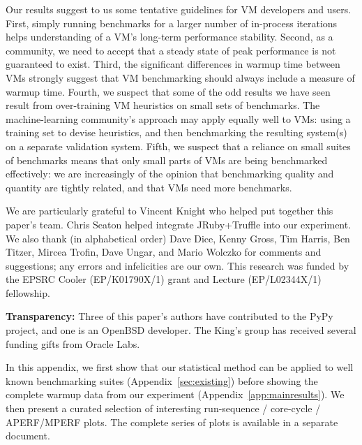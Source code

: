 \documentclass[acmlarge]{acmart}\settopmatter{printfolios=true}
\begin{document}
Our results suggest to us some tentative guidelines for VM
developers and users. First, simply running benchmarks for a larger number of
in-process iterations helps understanding of a VM's long-term
performance stability. Second, as a community, we need to accept that a steady
state of peak performance is not guaranteed to exist. Third, the significant
differences in warmup time between VMs strongly suggest that VM benchmarking
should always include a measure of warmup time. Fourth, we suspect that some of the odd
results we have seen result from over-training VM heuristics on small sets of
benchmarks. The machine-learning community's approach may apply
equally well to VMs: using a training set to devise heuristics, and then
benchmarking the resulting system(s) on a separate validation system. Fifth, we suspect
that a reliance on small suites of benchmarks means that only
small parts of VMs are being benchmarked effectively: we are increasingly of the
opinion that benchmarking quality and quantity are tightly related, and that VMs
need more benchmarks.

\begin{acks}
We are particularly grateful to Vincent Knight who helped put together this
paper's team. Chris Seaton helped integrate JRuby+Truffle into our experiment.
We also thank (in alphabetical order) Dave Dice, Kenny Gross, Tim Harris, Ben
Titzer, Mircea Trofin, Dave Ungar, and Mario Wolczko for comments and suggestions; any
errors and infelicities are our own. This research was funded by the EPSRC
Cooler (EP/K01790X/1) grant and Lecture (EP/L02344X/1) fellowship.

\textbf{Transparency:} Three of this paper's authors have contributed
to the PyPy project, and one is an OpenBSD developer. The
King's group has received several funding gifts from Oracle Labs.
\end{acks}





\clearpage

\appendix

\noindent In this appendix, we first show that our statistical method
can be applied to well known benchmarking suites (Appendix~\ref{sec:existing})
before showing the complete warmup data from our experiment
(Appendix~\ref{app:mainresults}). We
then present a curated selection of interesting run-sequence / core-cycle /
APERF/MPERF plots. The complete series of plots is available in a separate
document. 
\end{document}
